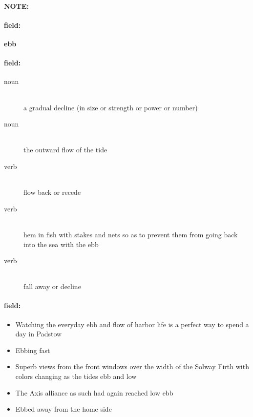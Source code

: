 \documentclass[12pt]{article}
\newenvironment{note}{\paragraph{NOTE:}}{}
\newenvironment{field}{\paragraph{field:}}{}
\begin{document}
\begin{note}
\begin{field}
\textbf{\large ebb}
\end{field}


\begin{field}
\begin{description}
\item[noun] \hfill \\ 
a gradual decline (in size or strength or power or number)

\item[noun] \hfill \\ 
the outward flow of the tide

\item[verb] \hfill \\ 
flow back or recede

\item[verb] \hfill \\ 
hem in fish with stakes and nets so as to prevent them from going back into the sea with the ebb

\item[verb] \hfill \\ 
fall away or decline

\end{description}
\end{field}

\begin{field}
\begin{itemize}
\item Watching the everyday ebb and flow of harbor life is a perfect way to spend a day in Padstow
\item Ebbing fast
\item Superb views from the front windows over the width of the Solway Firth with colors changing as the tides ebb and low
\item The Axis alliance as such had again reached low ebb
\item Ebbed away from the home side
\end{itemize}
\end{field}
\end{note}
\end{document}
